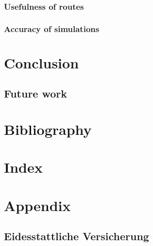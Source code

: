 \documentclass[
	11pt,
	a4paper,
	usegeometry,
	twoside,
	openright,
	toc=chapterentrywithdots
]{scrbook}
\begin{document}
			\subsection{Usefulness of routes}
			
			
			\subsection{Accuracy of simulations}
		
	
	\chapter{Conclusion}
	
		\section{Future work}
		
	\chapter*{Bibliography}
	
		\printbibliography
	
	\chapter*{Index}
	
		\printindex
	
	\chapter*{Appendix}
	
		\clearpage
		\section*{Eidesstattliche Versicherung}
		
\end{document}
